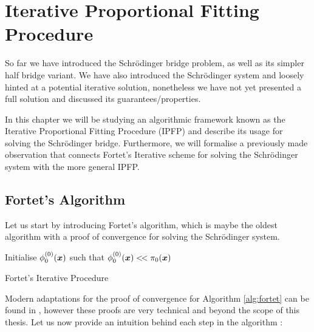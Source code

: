 \documentclass[a4paper,12pt,twoside,openright]{report}
\theoremstyle{definition}
\begin{document}
\chapter{Iterative Proportional Fitting Procedure}

So far we have introduced the Schrödinger bridge problem, as well as its simpler half bridge variant. We have also introduced the Schrödinger system and loosely hinted at a potential iterative solution, nonetheless we have not yet presented a full solution and discussed its guarantees/properties.

In this chapter we will be studying an algorithmic framework known as the Iterative Proportional Fitting Procedure (IPFP) \citep{csiszar1975divergence, kullback1968probability, ruschendorf1995convergence,cramer2000probability} and describe its usage for solving the Schrödinger bridge. Furthermore, we will formalise a previously made observation that connects Fortet's Iterative scheme \citep{fortet1940resolution} for solving the Schrödinger system with the more general IPFP. 

\section{Fortet's Algorithm}

Let us start by introducing Fortet's algorithm, which is maybe the oldest algorithm with a proof of convergence \cite{fortet1940resolution} for solving the Schrödinger system.

\begin{algorithm} \label{alg:fortet}
Initialise $\phi_0^{(0)}({\bm{x}})$ such that $\phi_0^{(0)}({\bm{x}}) <\!< \pi_0({\bm{x}})$ \\
\caption{Fortet's Iterative Procedure}
\end{algorithm}
Modern adaptations for the proof of convergence for Algorithm  \ref{alg:fortet} can be found in \citep{essid2019traversing, chen2016entropic}, however these proofs are very technical and beyond the scope of this thesis.  Let us now provide an intuition behind each step in the algorithm :
\end{document}
